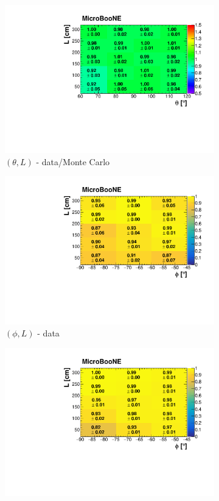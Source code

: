 \documentclass[a4paper,11pt]{article}
\begin{document}
\begin{figure}[htbp]
\begin{subfigure}{0.32\textwidth}
\includegraphics[width=\linewidth]{figures/theta_l2.pdf}
\caption{$(\theta,L)$ - data/Monte Carlo}
\end{subfigure}
\begin{subfigure}{0.32\textwidth}
  \includegraphics[width=\linewidth]{figures/e_phi_l.pdf}
  \caption{$(\phi,L)$ - data}
\end{subfigure}\begin{subfigure}{0.32\textwidth}
\includegraphics[width=\linewidth]{figures/phi_l_mc.pdf}

\end{subfigure}
\end{figure}
\end{document}
